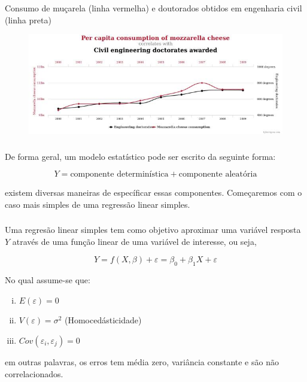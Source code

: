 \documentclass[14pt,aspectratio=1610]{beamer}
\begin{document}
\begin{frame}{}
\frametitle{ }
\begin{block}{}
\justifying
Consumo de muçarela (linha vermelha) e doutorados obtidos em engenharia civil (linha preta)
\end{block}
\begin{figure}[H]
    \centering
    \includegraphics[scale=0.5]{Figuras/Mucarela}
\end{figure}
\end{frame}

\begin{frame}{}
\frametitle{ }
\begin{block}{}
\justifying
De forma geral, um modelo estatístico pode ser escrito da seguinte forma:

$$Y=\textrm{componente determinística}+\textrm{componente aleatória}$$

existem diversas maneiras de específicar essas componentes. Começaremos com o caso mais simples de uma regressão linear simples.

\end{block}
\end{frame}


\begin{frame}{}
\frametitle{ }
\begin{block}{}
\justifying
Uma regresão linear simples tem como objetivo aproximar uma variável resposta $Y$ através de uma função linear de uma variável de interesse, ou seja,

$$Y=f(X,\beta)+\varepsilon=\beta_{0}+\beta_{1}X+\varepsilon$$

No qual assume-se que:

\begin{enumerate}[(i)]
\item $E(\varepsilon)=0$\pause
\item $V(\varepsilon)=\sigma^{2}$ (Homocedásticidade)\pause
\item $Cov(\varepsilon_{i},\varepsilon_{j})=0$
\end{enumerate}

em outras palavras, os erros tem média zero, variância constante e são não correlacionados.

\end{block}
\end{frame}
\end{document}
